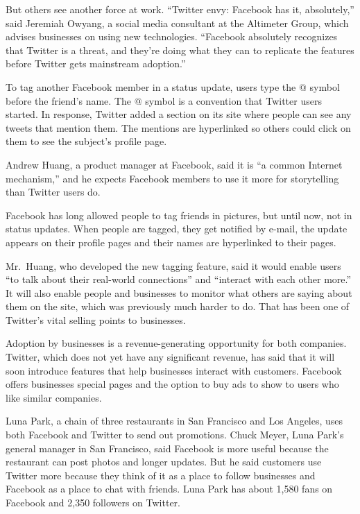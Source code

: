 ﻿\documentclass[12pt]{article}
\begin{document}
But others see another force at work. ``Twitter envy: Facebook has it, absolutely,'' said Jeremiah
Owyang, a social media consultant at the Altimeter Group, which advises businesses on using new
technologies. ``Facebook absolutely recognizes that Twitter is a threat, and they're doing what they
can to replicate the features before Twitter gets mainstream adoption.''

To tag another Facebook member in a status update, users type the $@$ symbol before the friend's
name. The $@$ symbol is a convention that Twitter users started. In response, Twitter added a
section on its site where people can see any tweets that mention them. The mentions are hyperlinked
so others could click on them to see the subject's profile page.

Andrew Huang, a product manager at Facebook, said it is ``a common Internet mechanism,'' and he
expects Facebook members to use it more for storytelling than Twitter users do.

Facebook has long allowed people to tag friends in pictures, but until now, not in status updates.
When people are tagged, they get notified by e-mail, the update appears on their profile pages and
their names are hyperlinked to their pages.

Mr.~Huang, who developed the new tagging feature, said it would enable users ``to talk about their
real-world connections'' and ``interact with each other more.'' It will also enable people and
businesses to monitor what others are saying about them on the site, which was previously much
harder to do. That has been one of Twitter's vital selling points to businesses.

Adoption by businesses is a revenue-generating opportunity for both companies. Twitter, which does
not yet have any significant revenue, has said that it will soon introduce features that help
businesses interact with customers. Facebook offers businesses special pages and the option to buy
ads to show to users who like similar companies.

Luna Park, a chain of three restaurants in San Francisco and Los Angeles, uses both Facebook and
Twitter to send out promotions. Chuck Meyer, Luna Park's general manager in San Francisco, said
Facebook is more useful because the restaurant can post photos and longer updates. But he said
customers use Twitter more because they think of it as a place to follow businesses and Facebook as
a place to chat with friends. Luna Park has about 1,580 fans on Facebook and 2,350 followers on
Twitter.
\end{document}
